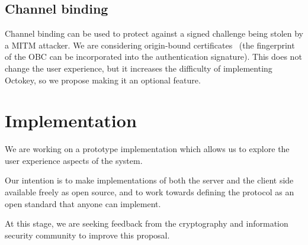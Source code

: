 \documentclass{acm_proc_article-sp}
\begin{document}
\subsection{Channel binding}

Channel binding can be used to protect against a signed challenge being stolen by a MITM attacker.
We are considering origin-bound certificates~\cite{Dietz12} (the fingerprint of the OBC can be
incorporated into the authentication signature). This does not change the user experience, but it
increases the difficulty of implementing Octokey, so we propose making it an optional feature.

\section{Implementation}

We are working on a prototype implementation which allows us to explore the user experience aspects
of the system.

Our intention is to make implementations of both the server and the client side available freely as
open source, and to work towards defining the protocol as an open standard that anyone can
implement.

At this stage, we are seeking feedback from the cryptography and information security community to
improve this proposal.

{}

\end{document}
